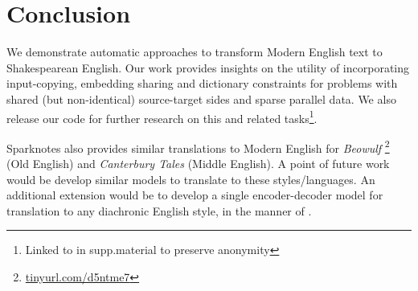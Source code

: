 \section{Conclusion} \label{sec:Conclusion}
We demonstrate automatic approaches to transform Modern English text to Shakespearean English. Our work provides insights on the utility of incorporating input-copying, embedding sharing and dictionary constraints for problems with shared (but non-identical) source-target sides and sparse parallel data. We also release our code for further research on this and related tasks\footnote{Linked to in supp.material to preserve anonymity}.

Sparknotes also provides similar translations to Modern English for \textit{Beowulf} \footnote{\url{tinyurl.com/d5ntme7}} (Old English) and \textit{Canterbury Tales}  (Middle English).  A point of future work would be develop similar models to translate to these styles/languages. An additional extension would be to develop a single encoder-decoder model for translation to any diachronic English style, in the manner of \cite{johnson2016google}.



